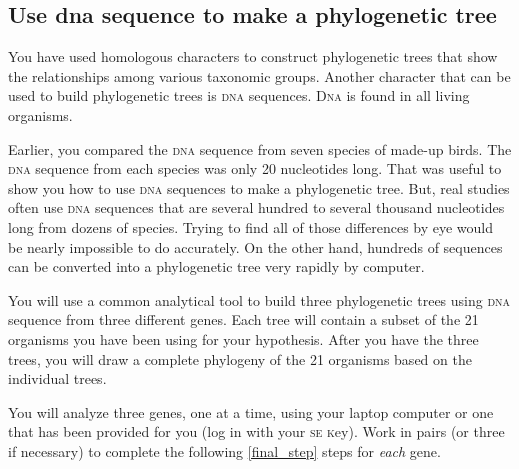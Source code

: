 \documentclass[12pt, hidelinks]{exam}
\newcommand{\dna}{\textsc{dna}}
\begin{document}
\subsection*{Use dna sequence to make a phylogenetic tree}

You have used homologous characters to construct phylogenetic trees that 
show the relationships among various taxonomic groups. Another character
that can be used to build phylogenetic trees is \textsc{dna} sequences. 
D\textsc{na} is found in all living organisms. 


Earlier, you compared the \dna{} sequence from seven species of made-up birds. 
The \dna{} sequence from each species was only 20 nucleotides long. That was useful
to show you how to use \dna{} sequences to make a phylogenetic tree. But, real studies
often use \dna{} sequences that are several hundred to several thousand nucleotides long
from dozens of species. Trying to find all of those differences by eye would be nearly impossible
to do accurately. On the other hand, hundreds of sequences can be converted into a phylogenetic tree very 
rapidly by computer. 

You will use a common analytical tool to build three phylogenetic trees using \dna{} sequence
from three different genes. Each tree will contain a subset of the 21 organisms you have been using for your hypothesis. After you have the three trees, you will draw a complete phylogeny of the 21 organisms based on the individual trees.

You will analyze three genes, one at a time, using your laptop computer or one that has been provided for you (log in with your \textsc{se k}ey).   Work in pairs (or three if necessary) to complete the following \ref{final_step} steps for \emph{each} gene.
\end{document}
